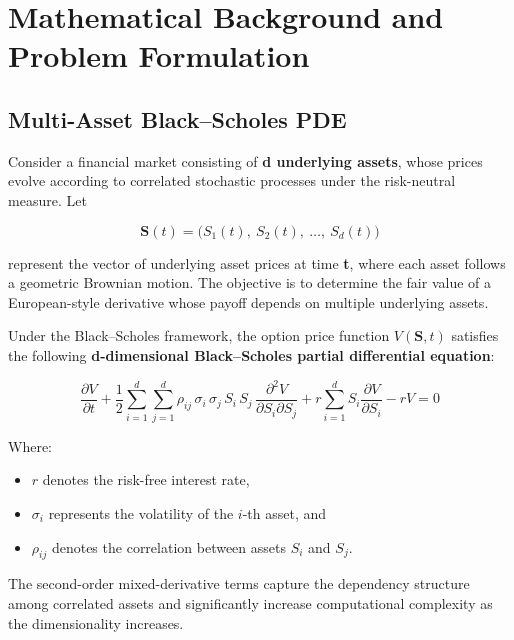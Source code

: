 \documentclass[12pt, a4paper]{article}
\begin{document}

\section{Mathematical Background and Problem Formulation}

\subsection{Multi-Asset Black--Scholes PDE}

Consider a financial market consisting of \textbf{d underlying assets},
whose prices evolve according to correlated stochastic processes under
the risk-neutral measure. Let

\[
    \mathbf{S}(t) = \bigl(S_1(t),\ S_2(t),\ \ldots,\ S_d(t)\bigr)
\]

represent the vector of underlying asset prices at time \textbf{t},
where each asset follows a geometric Brownian motion. The objective is
to determine the fair value of a European-style derivative whose payoff
depends on multiple underlying assets.

Under the Black--Scholes framework, the option price function
$V(\mathbf{S},t)$ satisfies the following \textbf{d-dimensional
Black--Scholes partial differential equation}:

\begin{equation}
    \frac{\partial V}{\partial t}
    + \frac{1}{2} \sum_{i=1}^{d} \sum_{j=1}^{d}
      \rho_{ij}\, \sigma_i\, \sigma_j\, S_i\, S_j\,
      \frac{\partial^2 V}{\partial S_i \partial S_j}
    + r \sum_{i=1}^{d} S_i \frac{\partial V}{\partial S_i}
    - rV = 0
    \label{eq:bs_pde}
\end{equation}

Where:
\begin{itemize}
    \item $r$ denotes the risk-free interest rate,
    \item $\sigma_i$ represents the volatility of the $i$-th asset, and
    \item $\rho_{ij}$ denotes the correlation between assets $S_i$ and
          $S_j$.
\end{itemize}

The second-order mixed-derivative terms capture the dependency
structure among correlated assets and significantly increase
computational complexity as the dimensionality increases.
\end{document}
